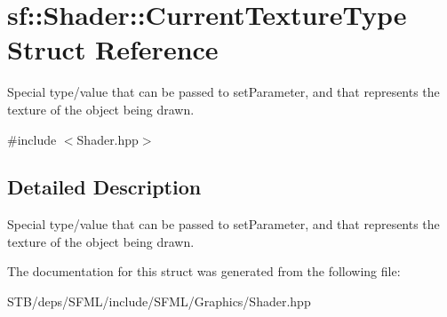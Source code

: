 \hypertarget{structsf_1_1_shader_1_1_current_texture_type}{\section{sf\+:\+:Shader\+:\+:Current\+Texture\+Type Struct Reference}
\label{structsf_1_1_shader_1_1_current_texture_type}
}


Special type/value that can be passed to set\+Parameter, and that represents the texture of the object being drawn.  




{\ttfamily \#include $<$Shader.\+hpp$>$}



\subsection{Detailed Description}
Special type/value that can be passed to set\+Parameter, and that represents the texture of the object being drawn. 

The documentation for this struct was generated from the following file\+:\begin{DoxyCompactItemize}
\item 
S\+T\+B/deps/\+S\+F\+M\+L/include/\+S\+F\+M\+L/\+Graphics/Shader.\+hpp\end{DoxyCompactItemize}
